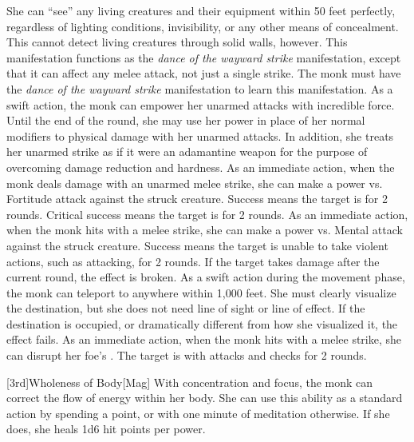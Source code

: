         She can ``see'' any living creatures and their equipment within 50 feet perfectly, regardless of lighting conditions, invisibility, or any other means of concealment.
        This cannot detect living creatures through solid walls, however.
        This \ki manifestation functions as the \textit{dance of the wayward strike} manifestation, except that it can affect any melee attack, not just a single strike.
        The monk must have the \textit{dance of the wayward strike} \ki manifestation to learn this manifestation.
        As a swift action, the monk can empower her unarmed attacks with incredible force.
        Until the end of the round, she may use her \ki power in place of her normal modifiers to physical damage with her unarmed attacks.
        In addition, she treats her unarmed strike as if it were an adamantine weapon for the purpose of overcoming damage reduction and hardness.
        As an immediate action, when the monk deals damage with an unarmed melee strike, she can make a \Ki power vs. Fortitude attack against the struck creature.
        Success means the target is \staggered for 2 rounds.
        Critical success means the target is \stunned for 2 rounds.
        \norepeatnotes
        As an immediate action, when the monk hits with a melee strike, she can make a \Ki power vs. Mental attack against the struck creature.
        Success means the target is unable to take violent actions, such as attacking, for 2 rounds.
        If the target takes damage after the current round, the effect is broken.
        As a swift action during the movement phase, the monk can teleport to anywhere within 1,000 feet.
        She must clearly visualize the destination, but she does not need line of sight or line of effect.
        If the destination is occupied, or dramatically different from how she visualized it, the effect fails.
        As an immediate action, when the monk hits with a melee strike, she can disrupt her foe's \ki.
        The target is \severelyimpaired with attacks and checks for 2 rounds.

        [3rd]{Wholeness of Body}[Mag]
        With concentration and focus, the monk can correct the flow of energy within her body.
        She can use this ability as a standard action by spending a \ki point, or with one minute of meditation otherwise.
        If she does, she heals 1d6 hit points per \ki power.

